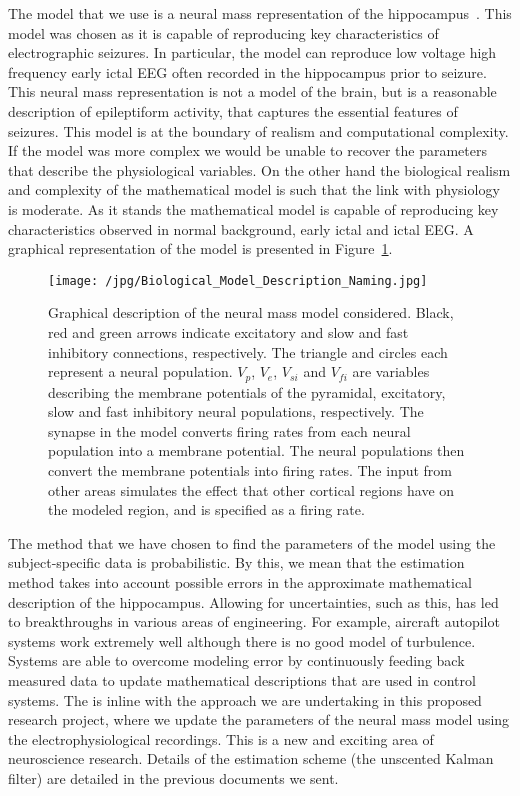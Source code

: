 The model that we use is a neural mass representation of the hippocampus~\citep{wendling2002epileptic}. This model was chosen as it is capable of reproducing key characteristics of electrographic seizures. In particular, the model can reproduce low voltage high frequency early ictal EEG often recorded in the hippocampus prior to seizure. This neural mass representation is not a model of the brain, but is a reasonable description of epileptiform activity, that captures the essential features of seizures. This model is at the boundary of realism and computational complexity. If the model was more complex we would be unable to recover the parameters that describe the physiological variables. On the other hand the biological realism and complexity of the mathematical model is such that the link with physiology is moderate. As it stands the mathematical model is capable of reproducing key characteristics observed in normal background, early ictal and ictal EEG.  A graphical representation of the model is presented in Figure~\ref{fig: NMM}.
\begin{figure}[t]
	\centering
		\texttt{[image: /jpg/Biological\_Model\_Description\_Naming.jpg]}
	\caption{Graphical description of the neural mass model considered. Black, red and green arrows indicate excitatory and slow and fast inhibitory connections, respectively. The triangle and circles each represent a neural population. $V_{p}$, $V_{e}$, $V_{si}$ and $V_{fi}$  are variables describing the membrane potentials of the pyramidal, excitatory, slow and fast inhibitory neural populations, respectively. The synapse in the model converts firing rates from each neural population into a membrane potential. The neural populations then convert the membrane potentials into firing rates. The input from other areas simulates the effect that other cortical regions have on the modeled region, and is specified as a firing rate.}
	\label{fig: NMM}
\end{figure}
The method that we have chosen to find the parameters of the model using the subject-specific data is probabilistic. By this, we mean that the estimation method takes into account possible errors in the approximate mathematical description of the hippocampus. Allowing for uncertainties, such as this, has led to breakthroughs in various areas of engineering. For example, aircraft autopilot systems work extremely well although there is no good model of turbulence. Systems are able to overcome modeling error by continuously feeding back measured data to update mathematical descriptions that are used in control systems. The is inline with the approach we are undertaking in this proposed research project, where we update the parameters of the neural mass model using the electrophysiological recordings. This is a new and exciting area of neuroscience research. Details of the estimation scheme (the unscented Kalman filter) are detailed in the previous documents we sent.

